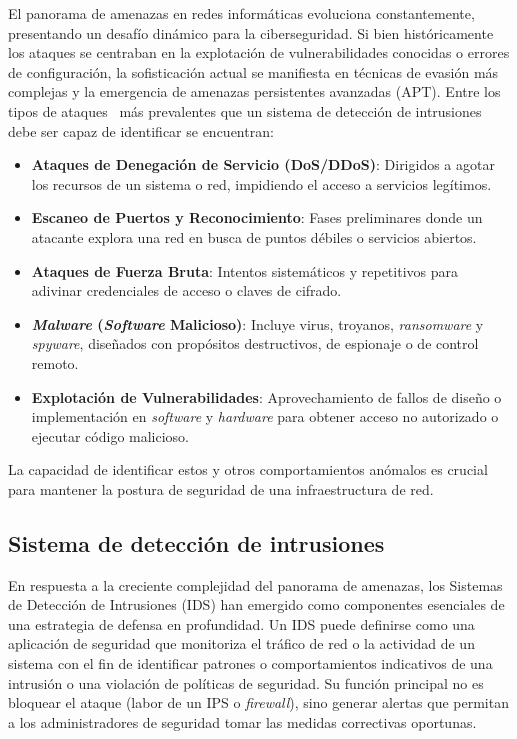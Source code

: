 El panorama de amenazas en redes informáticas evoluciona constantemente, presentando un desafío dinámico para la ciberseguridad. Si bien históricamente los ataques se centraban en la explotación de vulnerabilidades conocidas o errores de configuración, la sofisticación actual se manifiesta en técnicas de evasión más complejas y la emergencia de amenazas persistentes avanzadas (APT). Entre los tipos de ataques~\cite{enisaETL2023,anderson2020security} más prevalentes que un sistema de detección de intrusiones debe ser capaz de identificar se encuentran:
\begin{itemize}

    \item\textbf{Ataques de Denegación de Servicio (DoS/DDoS)}: Dirigidos a agotar los recursos de un sistema o red, impidiendo el acceso a servicios legítimos.
    
    \item\textbf{Escaneo de Puertos y Reconocimiento}: Fases preliminares donde un atacante explora una red en busca de puntos débiles o servicios abiertos.
    
    \item\textbf{Ataques de Fuerza Bruta}: Intentos sistemáticos y repetitivos para adivinar credenciales de acceso o claves de cifrado.
    
    \item\textbf{\textit{Malware} (\textit{Software} Malicioso)}: Incluye virus, troyanos, \textit{ransomware} y \textit{spyware}, diseñados con propósitos destructivos, de espionaje o de control remoto.
    
    \item\textbf{Explotación de Vulnerabilidades}: Aprovechamiento de fallos de diseño o implementación en \textit{software} y \textit{hardware} para obtener acceso no autorizado o ejecutar código malicioso.

\end{itemize}

La capacidad de identificar estos y otros comportamientos anómalos es crucial para mantener la postura de seguridad de una infraestructura de red.
    
\subsection{Sistema de detección de intrusiones}\label{Sec.Capitulos}

En respuesta a la creciente complejidad del panorama de amenazas, los Sistemas de Detección de Intrusiones (IDS) han emergido como componentes esenciales de una estrategia de defensa en profundidad. Un IDS puede definirse como una aplicación de seguridad que monitoriza el tráfico de red o la actividad de un sistema con el fin de identificar patrones o comportamientos indicativos de una intrusión o una violación de políticas de seguridad. Su función principal no es bloquear el ataque (labor de un IPS o \textit{firewall}), sino generar alertas que permitan a los administradores de seguridad tomar las medidas correctivas oportunas.

